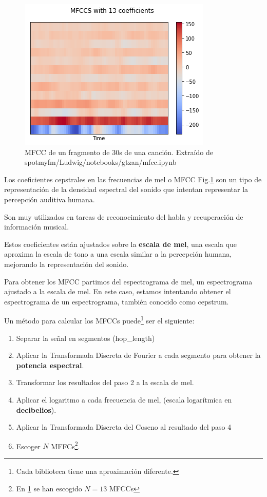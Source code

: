 \begin{figure}
    \centering
    \includegraphics{img/3/mfcc.png}
    \caption{MFCC de un fragmento de 30s de una canción. Extraído de spotmyfm/Ludwig/notebooks/gtzan/mfcc.ipynb}
    \label{fig:MFCC}
\end{figure}
Los coeficientes cepstrales en las frecuencias de mel o MFCC Fig.\ref{fig:MFCC} son un tipo
de representación de la densidad espectral del sonido que intentan
representar la percepción auditiva humana.

Son muy utilizados en tareas de reconocimiento del habla y recuperación
de información musical.

Estos coeficientes están ajustados sobre la \textbf{escala de mel}, una
escala que aproxima la escala de tono a una escala similar a la
percepción humana, mejorando la representación del sonido.

Para obtener los MFCC partimos del espectrograma de mel, un
espectrograma ajustado a la escala de mel. En este caso, estamos
intentando obtener el espectrograma de un espectrograma, también conocido como cepstrum.

Un método para calcular los MFCCs puede\footnote{Cada biblioteca tiene una aproximación diferente.} ser el siguiente:

\begin{enumerate}
\def\labelenumi{\arabic{enumi}.}
\item
  Separar la señal en segmentos (hop\_length)
\item
  Aplicar la Transformada Discreta de Fourier a cada segmento para
  obtener la \textbf{potencia espectral}.
\item
  Transformar los resultados del paso 2 a la escala de mel.
\item
  Aplicar el logaritmo a cada frecuencia de mel, (escala logarítmica en
  \textbf{decibelios}).
\item
  Aplicar la Transformada Discreta del Coseno al resultado del paso 4
\item
  Escoger $N$ MFFCs\footnote{En \ref{fig:MFCC} se han escogido $N=13$ MFCCs}.
\end{enumerate}

